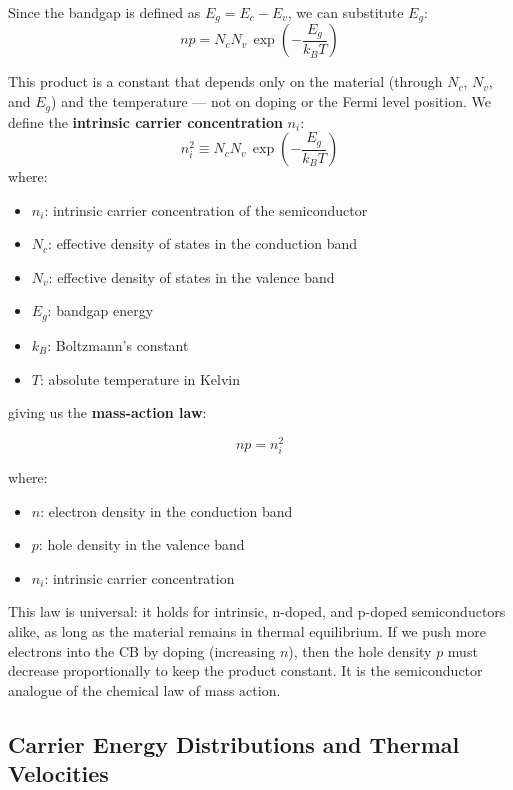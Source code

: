 Since the bandgap is defined as $E_g = E_c - E_v$, we can substitute $E_g$:
\begin{equation*}
    np = N_c N_v\,\exp\!\left(-\frac{E_g}{k_B T}\right)
\end{equation*}

This product is a constant that depends only on the material (through $N_c$, $N_v$, and $E_g$) and the temperature — not on doping or the Fermi level position. We define the \textbf{intrinsic carrier concentration} $n_i$:
\begin{equation*}
    n_i^2 \equiv N_c N_v\,\exp\!\left(-\frac{E_g}{k_B T}\right)
\end{equation*}
where:
\begin{itemize}
    \item $n_i$: intrinsic carrier concentration of the semiconductor
    \item $N_c$: effective density of states in the conduction band
    \item $N_v$: effective density of states in the valence band
    \item $E_g$: bandgap energy
    \item $k_B$: Boltzmann's constant
    \item $T$: absolute temperature in Kelvin
\end{itemize}

giving us the \textbf{mass-action law}:
\begin{keyresult}
    \begin{equation}
        np = n_i^2
    \end{equation}
\end{keyresult}
where:
\begin{itemize}
    \item $n$: electron density in the conduction band
    \item $p$: hole density in the valence band
    \item $n_i$: intrinsic carrier concentration
\end{itemize}

This law is universal: it holds for intrinsic, n-doped, and p-doped semiconductors alike, as long as the material remains in thermal equilibrium. If we push more electrons into the CB by doping (increasing $n$), then the hole density $p$ must decrease proportionally to keep the product constant. It is the semiconductor analogue of the chemical law of mass action.

\subsection{Carrier Energy Distributions and Thermal Velocities}

